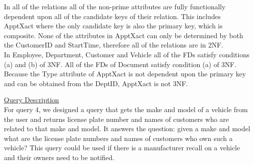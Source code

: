 \documentclass[12pt]{article}   %
\begin{document}
In all of the relations all of the non-prime attributes are fully functionally dependent upon all of the candidate keys of their relation. This includes ApptXact where the only candidate key is also the primary key, which is composite. None of the attributes in ApptXact can only be determined by both the CustomerID and StartTime, therefore all of the relations are in 2NF.\\

In Employee, Department, Customer and Vehicle all of the FDs satisfy conditions (a) and (b) of 3NF. All of the FDs of Document satisfy condition (a) of 3NF. Because the Type attribute of ApptXact is not dependent upon the primary key and can be obtained from the DeptID, ApptXact is not 3NF. 

\underline{Query Description}\\
For query 4, we designed a query that gets the make and model of a vehicle from the user and returns license plate number and names of customers who are related to that make and model. It answers the question: given a make and model what are the license plate numbers and names of customers who own such a vehicle? This query could be used if there is a manufacturer recall on a vehicle and their owners need to be notified. 
\end{document}
